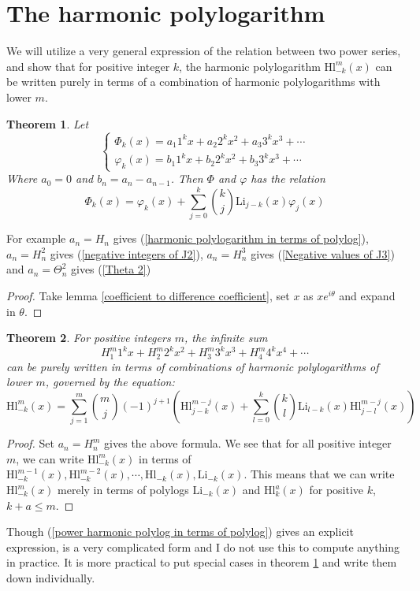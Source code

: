 \documentclass{article}
\newtheorem{theorem}{Theorem}
\begin{document}
\section{The harmonic polylogarithm}
We will utilize a very general expression of the relation between two power series, and show that for positive integer $k$, the harmonic polylogarithm $\mathrm{Hl}_{-k}^m(x)$ can be written purely in terms of a combination of harmonic polylogarithms with lower $m$. \par
\begin{theorem}\label{Master theorem of Dirichlet series at negative integers}
 Let $$\begin{cases}\Phi_k(x)=a_1 1^kx+a_2 2^k x^2+a_3 3^kx^3+\cdots \\
 \varphi_k(x)=b_1 1^kx+b_2 2^k x^2+b_3 3^kx^3+\cdots\end{cases}$$
 Where $a_0=0$ and $b_n=a_n-a_{n-1}$. Then $\Phi$ and $\varphi$ has the relation
 $$\Phi_k(x)=\varphi_k(x)+\sum_{j=0}^k \binom{k}{j}\mathrm{Li}_{j-k}(x)\varphi_j(x)$$\end{theorem}
For example $a_n=H_n$ gives (\ref{harmonic polylogarithm in terms of polylog}), $a_n=H_n^2$ gives (\ref{negative integers of J2}), $a_n=H_n^3$ gives (\ref{Negative values of J3}) and $a_n=\Theta_n^2$ gives (\ref{Theta 2})
\begin{proof}Take lemma \ref{coefficient to difference coefficient}, set $x$ as $xe^{i\theta}$ and expand in $\theta$. \end{proof}
\begin{theorem}\label{Harmonic polylog theorem}
    For positive integers $m$, the infinite sum $$H_1^m 1^kx+H_2^m 2^kx^2+H_3^m 3^kx^3+H_4^m 4^kx^4+\cdots$$ can be purely written in terms of combinations of harmonic polylogarithms of lower $m$, governed by the equation: \begin{equation}\label{power harmonic polylog in terms of polylog}\mathrm{Hl}_{-k}^m(x)=\sum_{j=1}^m\binom{m}{j}(-1)^{j+1}\left(\mathrm{Hl}_{j-k}^{m-j}(x)+\sum_{l=0}^k\binom{k}{l}\mathrm{Li}_{l-k}(x)\mathrm{Hl}_{j-l}^{m-j}(x)\right)\end{equation}
\end{theorem}
\begin{proof}
Set $a_n=H_n^m$ gives the above formula. We see that for all positive integer $m$, we can write $\mathrm{Hl}^m_{-k}(x)$ in terms of $\mathrm{Hl}^{m-1}_{-k}(x), \mathrm{Hl}^{m-2}_{-k}(x),\cdots , \mathrm{Hl}_{-k}(x),\mathrm{Li}_{-k}(x)$. This means that we can write $\mathrm{Hl}^m_{-k}(x)$ merely in terms of polylogs $\mathrm{Li}_{-k}(x)$ and $\mathrm{Hl}^{a}_{k}(x)$ for positive $k$, $k+a\leq m$.\end{proof}
Though (\ref{power harmonic polylog in terms of polylog}) gives an explicit expression, is a very complicated form and I do not use this to compute anything in practice. It is more practical to put special cases in theorem \ref{Master theorem of Dirichlet series at negative integers} and write them down individually.
\end{document}
